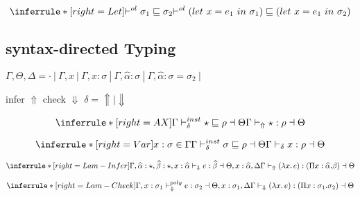 \[
\inferrule*[right=Let]
{
\olpolymorphic {\sigma_1} {\sigma_2 }}
{\olpolymorphic {(let\ x = e_1\ in\ \sigma_1)} {(let\ x = e_1\ in\ \sigma_2) }}
\]


\clearpage

\fi

\subsection{syntax-directed Typing}

\newcommand{\checktype}{\Gamma\vdash_\Downarrow}
\newcommand{\infertype}{\Gamma\vdash_\Uparrow}
\newcommand{\infercheck}{\Gamma\vdash_\delta}

\newcommand{\checktypeno}{\vdash_\Downarrow}
\newcommand{\infertypeno}{\vdash_\Uparrow}
\newcommand{\infercheckno}{\vdash_\delta}

\newcommand{\instinfer}{\vdash^{inst}_\Uparrow}
\newcommand{\instcheck}{\vdash^{inst}_\Downarrow}
\newcommand{\instinfercheck}{\vdash^{inst}_\delta}

\newcommand{\polyinfer}{\Gamma\vdash^{poly}_\Uparrow}
\newcommand{\polycheck}{\Gamma\vdash^{poly}_\Downarrow}
\newcommand{\polycheckno}{\vdash^{poly}_\Downarrow}
\newcommand{\polyinfercheck}{\vdash^{poly}_\delta}

\newcommand{\polymorphic}{\vdash^{dsk}}
\newcommand{\polymorphicstar}{\vdash^{dsk}}

\newcommand{\unify}{\vdash^{unify}}


$\Gamma, \Theta, \Delta  = \cdot~|~\Gamma, x~|~\Gamma, x:\sigma~|~\Gamma, \widehat{\alpha}:\sigma~|~\Gamma, \widehat{\alpha}:\sigma = \sigma_2~|$

\framebox{$ \infercheck e : \rho \dashv \Theta $ } infer $\Uparrow$ check $\Downarrow$ $\delta = \Uparrow \mid \Downarrow$

\[
\inferrule*[right=AX]
{\Gamma \instinfercheck \star \sqsubseteq \rho \dashv \Theta}
{\infertype \star : \rho \dashv \Theta}
\]

\[
\inferrule*[right=Var]
{x:\sigma \in \Gamma \\ \Gamma \instinfercheck \sigma \sqsubseteq \rho \dashv \Theta }
{\infercheck x : \rho \dashv \Theta}
\]

\[
\inferrule*[right=Lam-Infer]
{\Gamma, \widehat{\alpha}:\star, \widehat{\beta}:\star, x: \widehat \alpha \checktypeno e : \widehat \beta \dashv \Theta, x:\widehat \alpha , \Delta}
{\infertype (\lambda x.\, e) : (\Pi x: \widehat \alpha. \beta) \dashv \Theta}
\]

\[
\inferrule*[right=Lam-Check]
{\Gamma,x: \sigma_1 \polycheckno e : \sigma_2 \dashv \Theta, x: \sigma_1, \Delta}
{\checktype (\lambda x.\, e) : (\Pi x: \sigma_1. \sigma_2) \dashv \Theta}
\]

